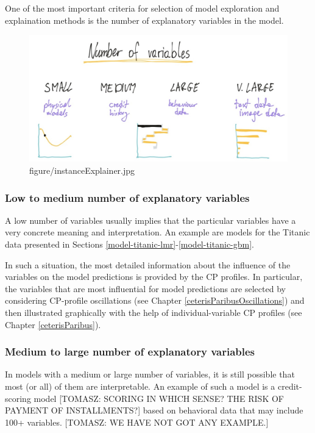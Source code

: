 \documentclass[12pt,]{krantz}
\begin{document}
One of the most important criteria for selection of model exploration and explaination methods is the number of explanatory variables in the model.

\begin{figure}
\centering
\includegraphics{figure/instanceExplainer.jpg}
\caption{figure/instanceExplainer.jpg}
\end{figure}

\hypertarget{low-to-medium-number-of-explanatory-variables}{%
\subsubsection{Low to medium number of explanatory variables}\label{low-to-medium-number-of-explanatory-variables}}

A low number of variables usually implies that the particular variables have a very concrete meaning and interpretation. An example are models for the Titanic data presented in Sections \ref{model-titanic-lmr}-\ref{model-titanic-gbm}.

In such a situation, the most detailed information about the influence of the variables on the model predictions is provided by the CP profiles. In particular, the variables that are most influential for model predictions are selected by considering CP-profile oscillations (see Chapter \ref{ceterisParibusOscillations}) and then illustrated graphically with the help of individual-variable CP profiles (see Chapter \ref{ceterisParibus}).

\hypertarget{medium-to-large-number-of-explanatory-variables}{%
\subsubsection{Medium to large number of explanatory variables}\label{medium-to-large-number-of-explanatory-variables}}

In models with a medium or large number of variables, it is still possible that most (or all) of them are interpretable. An example of such a model is a credit-scoring model {[}TOMASZ: SCORING IN WHICH SENSE? THE RISK OF PAYMENT OF INSTALLMENTS?{]} based on behavioral data that may include 100+ variables. {[}TOMASZ: WE HAVE NOT GOT ANY EXAMPLE.{]}
\end{document}
